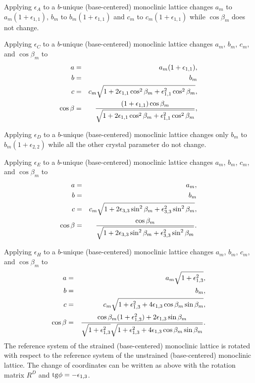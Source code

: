 \documentclass[12pt,a4paper,twoside]{report}
\begin{document}
Applying $\epsilon_A$ to a $b$-unique (base-centered) monoclinic 
lattice changes
$a_m$ to $a_m(1+\epsilon_{1,1})$, $b_m$ to $b_m(1+\epsilon_{1,1})$
and $c_m$ to $c_m(1+\epsilon_{1,1})$ while $\cos \beta_m$
does not change.

Applying $\epsilon_C$ to a $b$-unique (base-centered) monoclinic lattice 
changes $a_m$, $b_m$, $c_m$, and $\cos \beta_m$ to 
\begin{eqnarray}
a&=&a_m(1+\epsilon_{1,1}), \\
b&=&b_m \\
c&=&c_m \sqrt{1+2 \epsilon_{1,1}\cos^2\beta_m
+\epsilon_{1,1}^2 \cos^2\beta_m}, \\
\cos\beta &=& {(1+\epsilon_{1,1}) \cos\beta_m \over 
\sqrt{1+2 \epsilon_{1,1}\cos^2\beta_m
+\epsilon_{1,1}^2 \cos^2\beta_m}},
\end{eqnarray}

Applying $\epsilon_D$ to a $b$-unique (base-centered) monoclinic 
lattice changes
only $b_m$ to $b_m(1+\epsilon_{2,2})$ while all the other crystal
parameter do not change.

Applying $\epsilon_E$ to a $b$-unique (base-centered) monoclinic lattice 
changes $a_m$, $b_m$, $c_m$, and $\cos \beta_m$ to 
\begin{eqnarray}
a&=&a_m, \\
b&=&b_m \\
c&=&c_m \sqrt{1+2 \epsilon_{3,3}\sin^2\beta_m
+\epsilon_{3,3}^2 \sin^2\beta_m}, \\
\cos\beta &=& {\cos\beta_m \over \sqrt{1+2 \epsilon_{3,3}\sin^2\beta_m
+\epsilon_{3,3}^2 \sin^2\beta_m}}.
\end{eqnarray}

Applying $\epsilon_H$ to a $b$-unique (base-centered) monoclinic lattice 
changes $a_m$, $b_m$, $c_m$, and $\cos \beta_m$ to 
\begin{eqnarray}
a&=&a_m \sqrt{1+\epsilon_{1,3}^2}, \\
b&=&b_m, \\
c&=&c_m \sqrt{1+\epsilon_{1,3}^2
+4\epsilon_{1,3} \cos\beta_m \sin\beta_m}, \\
\cos\beta &=& {\cos\beta_m (1+\epsilon_{1,3}^2) + 2 \epsilon_{1,3} 
\sin \beta_m \over \sqrt{1+\epsilon_{1,3}^2}
\sqrt{1+\epsilon_{1,3}^2+4\epsilon_{1,3} \cos\beta_m \sin\beta_m}}.
\end{eqnarray}
The reference system of the strained (base-centered) monoclinic 
lattice is rotated 
with respect to the reference system of the unstrained  
(base-centered) monoclinic lattice. 
The change of coordinates can be written as above with the rotation matrix 
$R^D$ and ${\rm tg}\phi=-\epsilon_{1,3}$.
\end{document}
